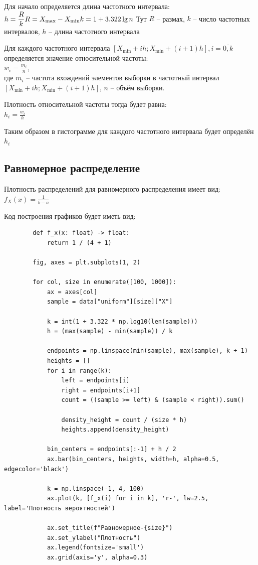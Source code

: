 \documentclass[a4paper,14pt]{extarticle}
\begin{document}
    Для начало определяется длина частотного интервала:\\
    $\displaystyle
    h = \frac{R}{k} \\
    R = X_{\max} - X_{\min} \\
    k = 1 + 3.322 \lg n \\
    $
    Тут $R$ -- размах, $k$ -- число частотных интервалов, $h$ -- длина частотного интервала

    Для каждого частотного интервала $[X_{\min} + ih; X_{\min} + (i + 1)h], i = \overline{0, k}$ определяется значение относительной частоты: \\
    $\displaystyle w_i = \frac{m_i}{n}$,\\
    где $m_i$ -- частота вхождений элементов выборки в частотный интервал $[X_{\min} + ih; X_{\min} + (i + 1)h]$, $n$ -- объём выборки.

    Плотность относительной частоты тогда будет равна:\\
    $\displaystyle h_i = \frac{w_i}{h}$

    Таким образом в гистограмме для каждого частотного интервала будет определён $h_i$

    \subsection{Равномерное распределение}

    Плотность распределений для равномерного распределения имеет вид:\\
    $\displaystyle f_X(x) = \frac{1}{b - a}$

    Код построения графиков будет иметь вид:
    \begin{verbatim}
        def f_x(x: float) -> float:
            return 1 / (4 + 1)

        fig, axes = plt.subplots(1, 2)

        for col, size in enumerate([100, 1000]):
            ax = axes[col]
            sample = data["uniform"][size]["X"]

            k = int(1 + 3.322 * np.log10(len(sample)))
            h = (max(sample) - min(sample)) / k

            endpoints = np.linspace(min(sample), max(sample), k + 1)
            heights = []
            for i in range(k):
                left = endpoints[i]
                right = endpoints[i+1]
                count = ((sample >= left) & (sample < right)).sum()
                
                density_height = count / (size * h)
                heights.append(density_height)

            bin_centers = endpoints[:-1] + h / 2
            ax.bar(bin_centers, heights, width=h, alpha=0.5, edgecolor='black')

            k = np.linspace(-1, 4, 100)
            ax.plot(k, [f_x(i) for i in k], 'r-', lw=2.5, label='Плотность вероятностей')

            ax.set_title(f"Равномерное-{size}")
            ax.set_ylabel("Плотность")
            ax.legend(fontsize='small')
            ax.grid(axis='y', alpha=0.3)
    \end{verbatim}
\end{document}
